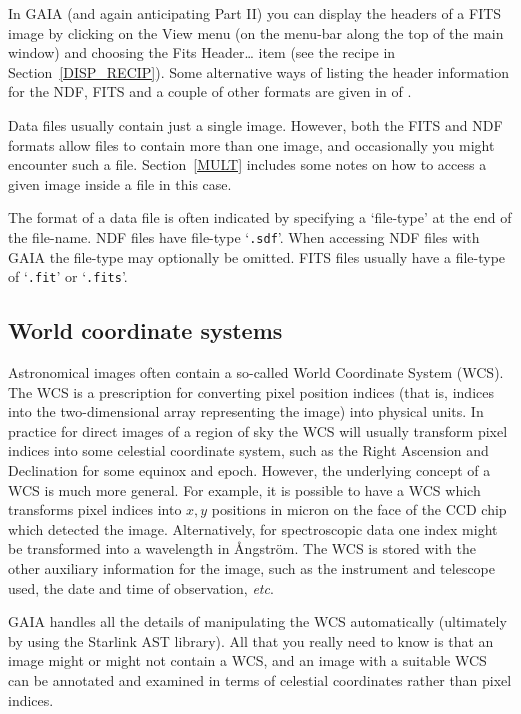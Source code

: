 \documentclass[twoside,11pt]{starlink}
\begin{document}
In GAIA (and again anticipating Part II) you can display the headers of a
FITS image by clicking on the \textsf{View} menu (on the menu-bar along the
top of the main window) and choosing the \textsf{Fits Header\ldots} item (see
the recipe in Section~\ref{DISP_RECIP}).  Some alternative ways of listing
the header information for the NDF, FITS and a couple of other formats are
given in  of \cite{SC6}.

Data files usually contain just a single image.  However, both the FITS
and NDF formats allow files to contain more than one image, and occasionally
you might encounter such a file.  Section~\ref{MULT} includes some notes
on how to access a given image inside a file in this case.

The format of a data file is often indicated by specifying a `file-type'
at the end of the file-name.  NDF files have file-type `\texttt{.sdf}'.
When accessing NDF files with GAIA the file-type may optionally be omitted.
FITS files usually have a file-type of `\texttt{.fit}' or `\texttt{.fits}'.

\subsection{\label{WCS}World coordinate systems}

Astronomical images often contain a so-called World Coordinate System
(WCS).  The WCS is a prescription for converting pixel position indices
(that is, indices into the two-dimensional array representing the image)
into physical units.  In practice for direct images of a region of sky
the WCS will usually transform pixel indices into some celestial coordinate
system, such as the Right Ascension and Declination for some equinox and
epoch.  However, the underlying concept of a WCS is much more general.
For example, it is possible to have a WCS which transforms pixel indices
into $x,y$\/ positions in micron on the face of the CCD chip which detected
the image.  Alternatively, for spectroscopic data one index might be
transformed into a wavelength in \AA ngstr\"{o}m.  The WCS is stored with
the other auxiliary information for the image, such as the instrument and
telescope used, the date and time of observation, \emph{etc}.

GAIA handles all the details of manipulating the WCS automatically
(ultimately by using the Starlink AST library).  All that you really
need to know is that an image might or might not contain a WCS, and an
image with a suitable WCS can be annotated and examined in terms of
celestial coordinates rather than pixel indices.
\end{document}
